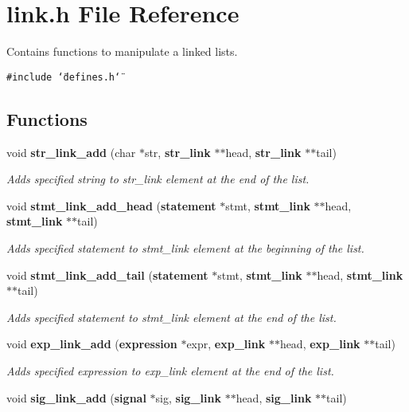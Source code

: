 \section{link.h File Reference}
\label{link_8h}
Contains functions to manipulate a linked lists.  


{\tt \#include \char`\"{}defines.h\char`\"{}}\par
\subsection*{Functions}
\begin{CompactItemize}
\item 
void {\bf str\_\-link\_\-add} (char $\ast$str, {\bf str\_\-link} $\ast$$\ast$head, {\bf str\_\-link} $\ast$$\ast$tail)
\begin{CompactList}\small\item\em Adds specified string to str\_\-link element at the end of the list. \item\end{CompactList}\item 
void {\bf stmt\_\-link\_\-add\_\-head} ({\bf statement} $\ast$stmt, {\bf stmt\_\-link} $\ast$$\ast$head, {\bf stmt\_\-link} $\ast$$\ast$tail)
\begin{CompactList}\small\item\em Adds specified statement to stmt\_\-link element at the beginning of the list. \item\end{CompactList}\item 
void {\bf stmt\_\-link\_\-add\_\-tail} ({\bf statement} $\ast$stmt, {\bf stmt\_\-link} $\ast$$\ast$head, {\bf stmt\_\-link} $\ast$$\ast$tail)
\begin{CompactList}\small\item\em Adds specified statement to stmt\_\-link element at the end of the list. \item\end{CompactList}\item 
void {\bf exp\_\-link\_\-add} ({\bf expression} $\ast$expr, {\bf exp\_\-link} $\ast$$\ast$head, {\bf exp\_\-link} $\ast$$\ast$tail)
\begin{CompactList}\small\item\em Adds specified expression to exp\_\-link element at the end of the list. \item\end{CompactList}\item 
void {\bf sig\_\-link\_\-add} ({\bf signal} $\ast$sig, {\bf sig\_\-link} $\ast$$\ast$head, {\bf sig\_\-link} $\ast$$\ast$tail)

\end{CompactItemize}
